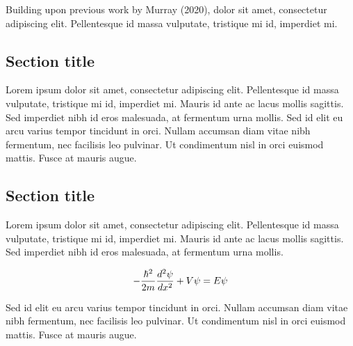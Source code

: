 \documentclass[
]{hdsr}
\begin{document}
Building upon previous work by Murray (2020), dolor sit amet,
consectetur adipiscing elit. Pellentesque id massa vulputate, tristique
mi id, imperdiet mi.

\hypertarget{section-title}{%
\subsection{Section title}\label{section-title}}

Lorem ipsum dolor sit amet, consectetur adipiscing elit. Pellentesque id
massa vulputate, tristique mi id, imperdiet mi. Mauris id ante ac lacus
mollis sagittis. Sed imperdiet nibh id eros malesuada, at fermentum urna
mollis. Sed id elit eu arcu varius tempor tincidunt in orci. Nullam
accumsan diam vitae nibh fermentum, nec facilisis leo pulvinar. Ut
condimentum nisl in orci euismod mattis. Fusce at mauris augue.

\hypertarget{section-title-1}{%
\subsection{Section title}\label{section-title-1}}

Lorem ipsum dolor sit amet, consectetur adipiscing elit. Pellentesque id
massa vulputate, tristique mi id, imperdiet mi. Mauris id ante ac lacus
mollis sagittis. Sed imperdiet nibh id eros malesuada, at fermentum urna
mollis.

\[
-\frac{\hbar^2}{2m} \frac{d^2 \psi}{dx^2} + V\psi = E\psi\\
\]

Sed id elit eu arcu varius tempor tincidunt in orci. Nullam accumsan
diam vitae nibh fermentum, nec facilisis leo pulvinar. Ut condimentum
nisl in orci euismod mattis. Fusce at mauris augue.
\end{document}
